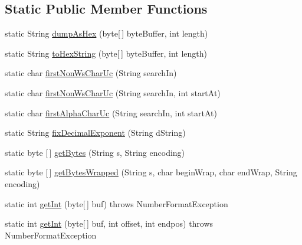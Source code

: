 \subsection*{Static Public Member Functions}
\begin{DoxyCompactItemize}
\item 
static String \mbox{\hyperlink{classcom_1_1mysql_1_1cj_1_1util_1_1_string_utils_a4e06b22b83cf91a4332b171d4d8b3553}{dump\+As\+Hex}} (byte\mbox{[}$\,$\mbox{]} byte\+Buffer, int length)
\item 
static String \mbox{\hyperlink{classcom_1_1mysql_1_1cj_1_1util_1_1_string_utils_a5ecf6c0b370e9f9fe6f9e05fad3f6026}{to\+Hex\+String}} (byte\mbox{[}$\,$\mbox{]} byte\+Buffer, int length)
\item 
static char \mbox{\hyperlink{classcom_1_1mysql_1_1cj_1_1util_1_1_string_utils_af86b1077afb79a0d47ea738df3933c13}{first\+Non\+Ws\+Char\+Uc}} (String search\+In)
\item 
static char \mbox{\hyperlink{classcom_1_1mysql_1_1cj_1_1util_1_1_string_utils_a61a0495e590c4a8acbbd552abf13046c}{first\+Non\+Ws\+Char\+Uc}} (String search\+In, int start\+At)
\item 
static char \mbox{\hyperlink{classcom_1_1mysql_1_1cj_1_1util_1_1_string_utils_a0824c6085207a70a49d56d58691714ef}{first\+Alpha\+Char\+Uc}} (String search\+In, int start\+At)
\item 
static String \mbox{\hyperlink{classcom_1_1mysql_1_1cj_1_1util_1_1_string_utils_a08f760ff86a02721422aa21707cfb80b}{fix\+Decimal\+Exponent}} (String d\+String)
\item 
static byte \mbox{[}$\,$\mbox{]} \mbox{\hyperlink{classcom_1_1mysql_1_1cj_1_1util_1_1_string_utils_a460ad9e9bb0873d806d2078891d8d416}{get\+Bytes}} (String s, String encoding)
\item 
static byte \mbox{[}$\,$\mbox{]} \mbox{\hyperlink{classcom_1_1mysql_1_1cj_1_1util_1_1_string_utils_aa586cd6c16fa10c7a9d6f29d06fcfd9d}{get\+Bytes\+Wrapped}} (String s, char begin\+Wrap, char end\+Wrap, String encoding)
\item 
static int \mbox{\hyperlink{classcom_1_1mysql_1_1cj_1_1util_1_1_string_utils_a0653402c5cb3efdbb51da23ad159673d}{get\+Int}} (byte\mbox{[}$\,$\mbox{]} buf)  throws Number\+Format\+Exception 
\item 
static int \mbox{\hyperlink{classcom_1_1mysql_1_1cj_1_1util_1_1_string_utils_a7be255e52788a8f7548ef0f4f56b526b}{get\+Int}} (byte\mbox{[}$\,$\mbox{]} buf, int offset, int endpos)  throws Number\+Format\+Exception 
\item 

\end{DoxyCompactItemize}
